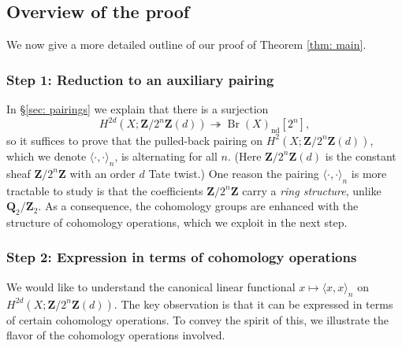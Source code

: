 \documentclass[10pt, reqno]{amsart}
\numberwithin{equation}{subsection}
\newcommand{\Q}{\mathbf{Q}}
\newcommand{\Z}{\mathbf{Z}}
\DeclareMathOperator{\et}{\acute{e}t}
\DeclareMathOperator{\Br}{Br}
\DeclareMathOperator{\nd}{nd}
\theoremstyle{remark}
\begin{document}


\subsection{Overview of the proof}\label{subsec: overview}

We now give a more detailed outline of our proof of Theorem \ref{thm: main}. 


\subsubsection*{Step 1: Reduction to an auxiliary pairing}

 In \S \ref{sec: pairings} we explain that there is a surjection 
\[
H^{2d}_{\et}(X; \Z/2^n\Z(d)) \twoheadrightarrow \Br(X)_{\nd}[2^n],
\]
so it suffices to prove that the pulled-back pairing on $H^2_{\et}(X; \Z/2^n\Z(d))$, which we denote $\langle \cdot, \cdot \rangle_n$, is alternating for all $n$. (Here $\Z/2^n\Z(d)$ is the constant sheaf $\Z/2^n \Z$ with an order $d$ Tate twist.) One reason the pairing $\langle \cdot, \cdot \rangle_n$ is more tractable to study is that the coefficients $\Z/2^n \Z$ carry a \emph{ring structure}, unlike $\Q_2/\Z_2$. As a consequence, the cohomology groups are enhanced with the structure of cohomology operations, which we exploit in the next step. 

\subsubsection*{Step 2: Expression in terms of cohomology operations}

We would like to understand the canonical linear functional $x \mapsto \langle x, x \rangle_n$ on $H^{2d}_{\et}(X; \Z/2^n\Z(d)) $. The key observation is that it can be expressed in terms of certain cohomology operations. To convey the spirit of this, we illustrate the flavor of the cohomology operations involved. 
\end{document}
